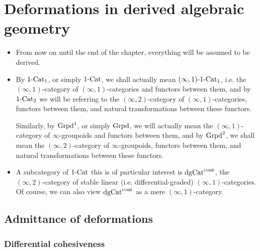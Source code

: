 \section{Deformations in derived algebraic geometry}
    \begin{convention} \label{conv: deformation_theory_everything_is_derived}
        \noindent
        \begin{itemize}
            \item From now on until the end of the chapter, everything will be assumed to be derived. 
            \item By $1\text{-}\mathrm{Cat}_1$, or simply $1\text{-}\mathrm{Cat}$, we shall actually mean $(\infty, 1)\text{-}1\text{-}\mathrm{Cat}_1$, i.e. the $(\infty, 1)$-category of $(\infty, 1)$-categories and functors between them, and by $1\text{-}\mathrm{Cat}_2$ we will be referring to the $(\infty, 2)$-category of $(\infty, 1)$-categories, functors between them, and natural transformations between these functors. 
            
            Similarly, by $\mathrm{Grpd}^1$, or simply $\mathrm{Grpd}$, we will actually mean the $(\infty, 1)$-category of $\infty$-groupoids and functors between them, and by $\mathrm{Grpd}^2$, we shall mean the $(\infty, 2)$-category of $\infty$-groupoids, functors between them, and natural transformations between these functors.
            \item A subcategory of $1\text{-}\mathrm{Cat}$ this is of particular interest is $\mathrm{dg}\mathrm{Cat}^{\mathrm{cont}}$, the $(\infty, 2)$-category of stable linear (i.e. differential-graded) $(\infty, 1)$-categories. Of course, we can also view $\mathrm{dg}\mathrm{Cat}^{\mathrm{cont}}$ as a mere $(\infty, 1)$-category.
        \end{itemize}
    \end{convention}
    
    \subsection{Admittance of deformations}
        \subsubsection{Differential cohesiveness}
    
